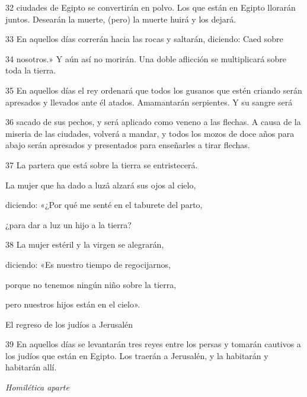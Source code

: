 \par 32 ciudades de Egipto se convertirán en polvo. Los que están en Egipto llorarán juntos. Desearán la muerte, (pero) la muerte huirá y los dejará.

\par 33 En aquellos días correrán hacia las rocas y saltarán, diciendo: Caed sobre

\par 34 nosotros.» Y aún así no morirán. Una doble aflicción se multiplicará sobre toda la tierra.

\par 35 En aquellos días el rey ordenará que todos los gusanos que estén criando serán apresados ​​y llevados ante él atados. Amamantarán serpientes. Y su sangre será

\par 36 sacado de sus pechos, y será aplicado como veneno a las flechas. A causa de la miseria de las ciudades, volverá a mandar, y todos los mozos de doce años para abajo serán apresados ​​y presentados para enseñarles a tirar flechas.

\par 37 La partera que está sobre la tierra se entristecerá.

\par La mujer que ha dado a luzâ alzará sus ojos al cielo,

\par diciendo: «¿Por qué me senté en el taburete del parto,

¿para dar a luz un hijo a la tierra?

\par 38 La mujer estéril y la virgen se alegrarán,

\par diciendo: «Es nuestro tiempo de regocijarnos,

\par porque no tenemos ningún niño sobre la tierra,

\par pero nuestros hijos están en el cielo».

\par El regreso de los judíos a Jerusalén

\par 39 En aquellos días se levantarán tres reyes entre los persas y tomarán cautivos a los judíos que están en Egipto. Los traerán a Jerusalén, y la habitarán y habitarán allí.

\par \textit{Homilética aparte}

